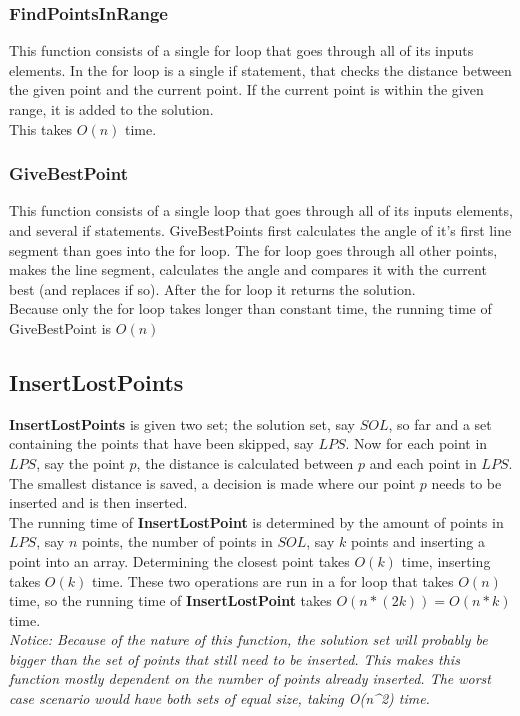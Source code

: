 \documentclass[]{article}
\begin{document}
  
  \subsubsection{FindPointsInRange} %
  \label{ref:rtafpir}
    This function consists of a single for loop that goes through all of its inputs elements. In the for loop is a single if statement, that checks the distance between the given point and the current point. If the current point is within the given range, it is added to the solution. \\
    This takes $O(n)$ time.
  
  \subsubsection{GiveBestPoint} %
  \label{ssub:rtagbp}
    This function consists of a single loop that goes through all of its inputs elements, and several if statements. GiveBestPoints first calculates the angle of it's first line segment than goes into the for loop. The for loop goes through all other points, makes the line segment, calculates the angle and compares it with the current best (and replaces if so). After the for loop it returns the solution. \\
    Because only the for loop takes longer than constant time, the running time of GiveBestPoint is $O(n)$
  
  \subsection{InsertLostPoints} %
  \label{sub:insertlostpoints}
    \textbf{InsertLostPoints} is given two set; the solution set, say $SOL$, so far and a set containing the points that have been skipped, say $LPS$. Now for each point in $LPS$, say the point $p$, the distance is calculated between $p$ and each point in $LPS$. The smallest distance is saved, a decision is made where our point $p$ needs to be inserted and is then inserted.\\
     The running time of \textbf{InsertLostPoint} is determined by the amount of points in $LPS$, say $n$ points, the number of points in $SOL$, say $k$ points and inserting a point into an array. Determining the closest point takes $O(k)$ time, inserting takes $O(k)$ time. These two operations are run in a for loop that takes $O(n)$ time, so the running time of \textbf{InsertLostPoint} takes $O(n*(2k)) = O(n*k)$ time.\\
     \emph{Notice: Because of the nature of this function, the solution set will probably be bigger than the set of points that still need to be inserted. This makes this function mostly dependent on the number of points already inserted. The worst case scenario would have both sets of equal size, taking O(n^2) time.} 
  
\end{document}
